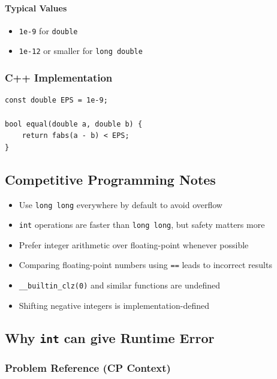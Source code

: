 \documentclass[11pt]{article}
\begin{document}
\paragraph{Typical Values}
\begin{itemize}
    \item \texttt{1e-9} for \texttt{double}
    \item \texttt{1e-12} or smaller for \texttt{long double}
\end{itemize}

\subsubsection{C++ Implementation}
\begin{lstlisting}
const double EPS = 1e-9;

bool equal(double a, double b) {
    return fabs(a - b) < EPS;
}
\end{lstlisting}

\subsection{Competitive Programming Notes}

\begin{itemize}
    \item Use \texttt{long long} everywhere by default to avoid overflow
    \item \texttt{int} operations are faster than \texttt{long long}, but safety matters more
    \item Prefer integer arithmetic over floating-point whenever possible
    \item Comparing floating-point numbers using \texttt{==} leads to incorrect results
    \item \texttt{\_\_builtin\_clz(0)} and similar functions are undefined
    \item Shifting negative integers is implementation-defined
\end{itemize}

\subsection{Why \texttt{int} can give Runtime Error}

\subsubsection{Problem Reference (CP Context)}
\end{document}
